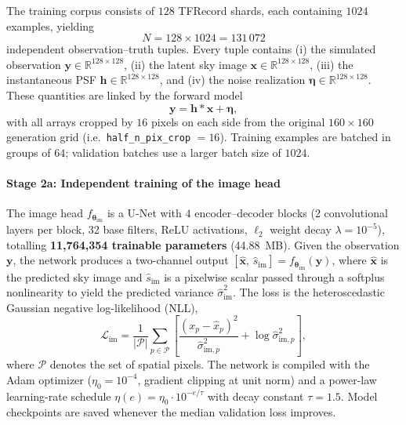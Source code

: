 \documentclass{aa}
\begin{document}
The training corpus consists of $128$ TFRecord shards, each containing $1024$ examples, yielding
\begin{equation}
N = 128 \times 1024 = 131\,072
\end{equation}
independent observation--truth tuples. Every tuple contains (i) the simulated observation $\mathbf{y} \in \mathbb{R}^{128 \times 128}$, (ii) the latent sky image $\mathbf{x} \in \mathbb{R}^{128 \times 128}$, (iii) the instantaneous PSF $\mathbf{h} \in \mathbb{R}^{128 \times 128}$, and (iv) the noise realization $\boldsymbol{\eta} \in \mathbb{R}^{128 \times 128}$. These quantities are linked by the forward model
\begin{equation}
\mathbf{y} = \mathbf{h} \ast \mathbf{x} + \boldsymbol{\eta},
\end{equation}
with all arrays cropped by $16$ pixels on each side from the original $160 \times 160$ generation grid (i.e.\ \texttt{half\_n\_pix\_crop} $= 16$). Training examples are batched in groups of $64$; validation batches use a larger batch size of $1024$.

\paragraph{Stage 2a: Independent training of the image head}

The image head $f_{\boldsymbol{\theta}_\mathrm{im}}$ is a U-Net with $4$ encoder--decoder blocks (2 convolutional layers per block, 32 base filters, ReLU activations, $\ell_2$ weight decay $\lambda = 10^{-5}$), totalling \textbf{11,764,354 trainable parameters} (44.88~MB). Given the observation $\mathbf{y}$, the network produces a two-channel output $[\hat{\mathbf{x}},\, \hat{s}_\mathrm{im}] = f_{\boldsymbol{\theta}_\mathrm{im}}(\mathbf{y})$, where $\hat{\mathbf{x}}$ is the predicted sky image and $\hat{s}_\mathrm{im}$ is a pixelwise scalar passed through a softplus nonlinearity to yield the predicted variance $\hat{\sigma}^{2}_\mathrm{im}$. The loss is the heteroscedastic Gaussian negative log-likelihood (NLL),
\begin{equation}
\mathcal{L}_\mathrm{im}
=
\frac{1}{|\mathcal{P}|}\sum_{p \in \mathcal{P}}
\left[
\frac{(x_p - \hat{x}_p)^{2}}{\hat{\sigma}^{2}_{\mathrm{im},p}}
+ \log \hat{\sigma}^{2}_{\mathrm{im},p}
\right],
\end{equation}
where $\mathcal{P}$ denotes the set of spatial pixels. The network is compiled with the Adam optimizer ($\eta_0 = 10^{-4}$, gradient clipping at unit norm) and a power-law learning-rate schedule $\eta(e) = \eta_0 \cdot 10^{-e/\tau}$ with decay constant $\tau = 1.5$. Model checkpoints are saved whenever the median validation loss improves.
\end{document}
